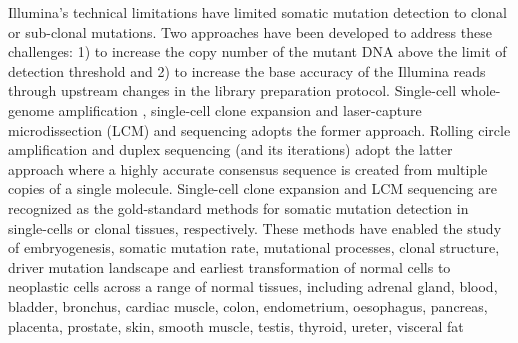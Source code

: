 Illumina’s technical limitations have limited somatic mutation detection to clonal or sub-clonal mutations. Two approaches have been developed to address these challenges: 1) to increase the copy number of the mutant DNA above the limit of detection threshold and 2) to increase the base accuracy of the Illumina reads through upstream changes in the library preparation protocol. Single-cell whole-genome amplification \cite{Lodato2018-hh}, single-cell clone expansion \cite{Lee-Six2018-qe} and laser-capture microdissection (LCM) \cite{Ellis2021-it} and sequencing adopts the former approach. Rolling circle amplification \cite{Lizardi1998-qh, Dahl2004-tm} and duplex sequencing (and its iterations) \cite{Schmitt2012-yr, Abascal2021-pk, Hoang2016-jx} adopt the latter approach where a highly accurate consensus sequence is created from multiple copies of a single molecule. Single-cell clone expansion and LCM sequencing are recognized as the gold-standard methods for somatic mutation detection in single-cells or clonal tissues, respectively. These methods have enabled the study of embryogenesis, somatic mutation rate, mutational processes, clonal structure, driver mutation landscape and earliest transformation of normal cells to neoplastic cells across a range of normal tissues, including adrenal gland, blood, bladder, bronchus, cardiac muscle, colon, endometrium, oesophagus, pancreas, placenta, prostate, skin, smooth muscle, testis, thyroid, ureter, visceral fat \cite{Lee-Six2018-qe, Martincorena2015-gu, Ju2017-vw, Martincorena2018-av, Brunner2019-xg, Lee-Six2019-vt, Yoshida2020-yr, Olafsson2020-vi, Moore2020-pi, Lawson2020-em, MSpencer_Chapman2021-cq, Coorens2021-ct, Robinson2021-te, Grossmann2021-gd, Moore2021-dl, Park2021-fx, Ng2021-jd}

